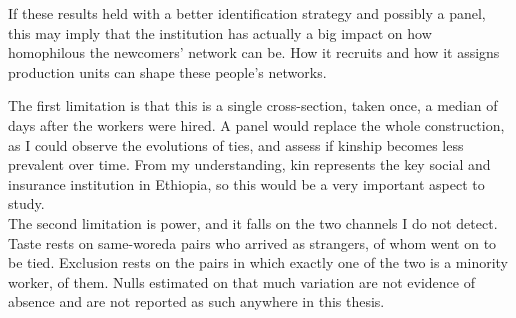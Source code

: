 \noindent  If these results held with a better identification strategy and possibly a panel, this may imply that the institution has actually a big impact on how homophilous the newcomers' network can be. How it recruits and how it assigns production units can shape these people's networks. \\


\noindent The first limitation is that this is a single cross-section, taken once, a median of \pnHireLagMedian{} days after the workers were hired. A panel would replace the whole construction, as I could observe the evolutions of ties, and assess if kinship becomes less prevalent over time. From my understanding, kin represents the key social and insurance institution in Ethiopia, so this would be a very important aspect to study. \\

\noindent The second limitation is power, and it falls on the two channels I do not detect. Taste rests on \pnChanTasteOriginPairs{} same-woreda pairs who arrived as strangers, of whom \pnChanTasteTies{} went on to be tied. Exclusion rests on the pairs in which exactly one of the two is a minority worker, \pnChanExclOutPairs{} of them. Nulls estimated on that much variation are not evidence of absence and are not reported as such anywhere in this thesis. \\
